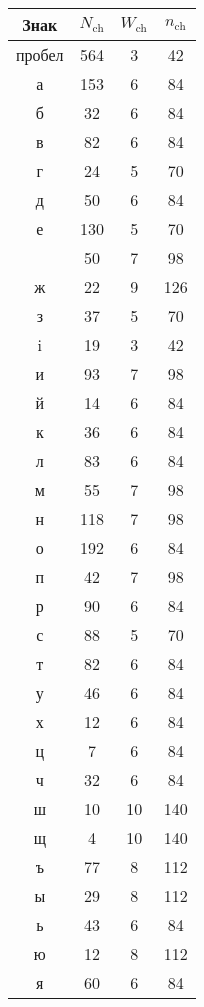 \begin{multicols}{2}
{\small \begin{center}
\tabcolsep=15pt
\begin{tabular}{|c|c|c|c|}
\hline
Знак&$N_{\mathrm{ch}}$&$W_{\mathrm{ch}}$&$n_{\mathrm{ch}}$\\
\hline
пробел&564\hphantom{9}&3&42\\
а&153\hphantom{9}&6&84\\
б&32&6&84\\
в&82&6&84\\
г&24&5&70\\
д&50&6&84\\
е&130\hphantom{9}&5&70\\
\hspace*{-1pt}{\raisebox{-2pt}{
\epsfxsize=2.276mm
\epsfbox{izhitca.eps}
}}
&50&7&98\\
ж&22&9&126\hphantom{9}\\
з&37&5&70\\
i&19&3&42\\
и&93&7&98\\
й&14&6&84\\
к&36&6&84\\
л&83&6&84\\
м&55&7&98\\
н&118\hphantom{9}&7&98\\
о&192\hphantom{9}&6&84\\
п&42&7&98\\
р&90&6&84\\
с&88&5&70\\
т&82&6&84\\
у&46&6&84\\
х&12&6&84\\
ц&\hphantom{9}7&6&84\\
ч&32&6&84\\
ш&10&10\hphantom{9}&140\hphantom{9}\\
щ&\hphantom{9}4&10\hphantom{9}&140\hphantom{9}\\
ъ&77&8&112\hphantom{9}\\
ы&29&8&112\hphantom{9}\\
ь&43&6&84\\
ю&12&8&112\hphantom{9}\\
я&60&6&84\\
\hline
\end{tabular}
\end{center}
}
\vspace*{6pt}


\addtocounter{table}{1}



\end{multicols}
